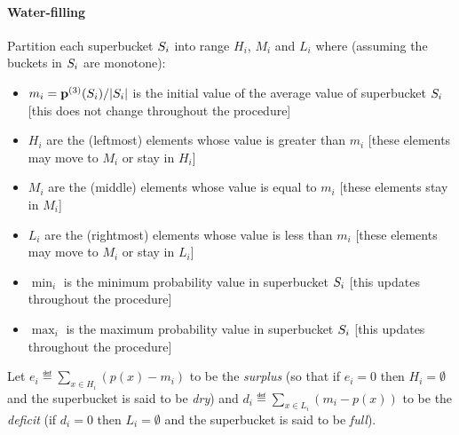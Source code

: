 \paragraph{Water-filling}
Partition each superbucket $S_i$ into range $H_i$, $M_i$ and $L_i$ where (assuming the buckets in  $S_i$ are monotone):
\begin{itemize}[-]
  \item $m_i={\mathbf{p}^{(3)}(S_i)}/{\left\lvert S_i \right\rvert}$ is the initial value of the average value of superbucket $S_i$ [this does not change throughout the procedure]
  \item $H_i$ are the (leftmost) elements whose value is greater than $m_i$ \hfill [these elements may move to $M_i$ or stay in $H_i$]
  \item $M_i$ are the (middle) elements whose value is equal to $m_i$    \hfill[these elements stay in $M_i$]
  \item $L_i$ are the (rightmost) elements whose value is less than $m_i$  \hfill[these elements may move to $M_i$ or stay in $L_i$]
  \item $\min_i$ is the minimum probability value in superbucket $S_i$   \hfill[this updates throughout the procedure]
  \item $\max_i$ is the maximum probability value in superbucket $S_i$   \hfill[this updates throughout the procedure]
\end{itemize}
Let $e_i \eqdef \sum_{x \in H_i} (p(x) - m_i)$ to be the \emph{surplus}  (so that if $e_i=0$ then $H_i=\emptyset$ and the superbucket is said to be \emph{dry}) and $d_i \eqdef \sum_{x \in L_i} (m_i- p(x))$ to be the \emph{deficit} (if $d_i = 0$ then $L_i=\emptyset$ and the superbucket is said to be \emph{full}).


